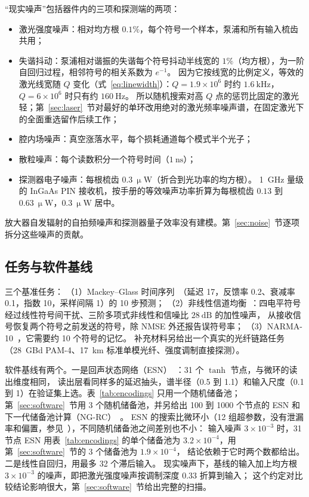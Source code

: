 “现实噪声”包括器件内的三项和探测端的两项：
\begin{itemize}
\item 激光强度噪声：相对均方根 $0.1\%$，每个符号一个样本，泵浦和所有输入梳齿共用；
\item 失谐抖动：泵浦相对谐振的失谐每个符号抖动半线宽的 $1\%$（均方根），为一阶自回归过程，相邻符号的相关系数为 $e^{-1}$。
      因为它按线宽的比例定义，等效的激光线宽随 $Q$ 变化（式~\eqref{eq:linewidth}）：$Q=1.9\times10^{6}$ 时约 $1.6~\mathrm{kHz}$，$Q=6\times10^{6}$ 时只有约 $160~\mathrm{Hz}$。
      所以随机搜索对高 $Q$ 点的惩罚比固定的激光轻；第~\ref{sec:laser}~节对最好的单环改用绝对的激光频率噪声谱，在固定激光下的全面重选留作后续工作；
\item 腔内场噪声：真空涨落水平，每个损耗通道每个模式半个光子；
\item 散粒噪声：每个读数积分一个符号时间（$1~\mathrm{ns}$）；
\item 探测器电子噪声：每根梳齿 $0.3~\upmu\mathrm{W}$（折合到光功率的均方根）。
      1~GHz 量级的 InGaAs PIN 接收机，按手册的等效噪声功率折算为每根梳齿 $0.13$ 到 $0.63~\upmu\mathrm{W}$，$0.3~\upmu\mathrm{W}$ 居中。
\end{itemize}
放大器自发辐射的自拍频噪声和探测器量子效率没有建模。第~\ref{sec:noise}~节逐项拆分这些噪声的贡献。

\subsection{任务与软件基线}\label{sec:tasks}

三个基准任务：
（1）Mackey--Glass 时间序列~\cite{mackey1977}（延迟 17，反馈率 0.2、衰减率 0.1，指数 10，采样间隔 1）的 10 步预测；
（2）非线性信道均衡~\cite{jaeger2004}：四电平符号经过线性符号间干扰、三阶多项式非线性和信噪比 $28~\mathrm{dB}$ 的加性噪声，
从接收信号恢复两个符号之前发送的符号，除 NMSE 外还报告误符号率；
（3）NARMA-10~\cite{atiya2000}，它需要约 10 个符号的记忆。
补充材料另给出一个真实的光纤链路任务（28~GBd PAM-4、17~km 标准单模光纤、强度调制直接探测）。

软件基线有两个。一是回声状态网络（ESN）~\cite{jaeger2001}：31 个 $\tanh$ 节点，与微环的读出维度相同，
读出层看同样多的延迟抽头，谱半径（0.5 到 1.1）和输入尺度（0.1 到 1）在验证集上选。表~\ref{tab:encodings} 只用一个随机储备池；
第~\ref{sec:software}~节用 3 个随机储备池，并另给出 100 到 1000 个节点的 ESN 和下一代储备池计算（NG-RC）~\cite{gauthier2021}。
ESN 的搜索比微环小（12 组超参数，没有泄漏率和偏置，参见~\cite{lukosevicius2012}），不同随机储备池之间差别也不小：
输入噪声 $3\times10^{-3}$ 时，31 节点 ESN 用表~\ref{tab:encodings} 的单个储备池为 $3.2\times10^{-4}$，用第~\ref{sec:software}~节的 3 个储备池为 $1.9\times10^{-4}$，
结论依赖于它时两个数都给出。二是线性自回归，用最多 32 个滞后输入。
现实噪声下，基线的输入加上均方根 $3\times10^{-3}$ 的噪声，即把激光强度噪声按调制深度 $0.33$ 折算到输入；
这个约定对比较结论影响很大，第~\ref{sec:software}~节给出完整的扫描。


